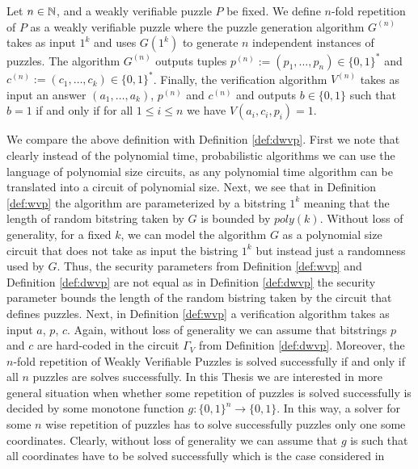\documentclass[11pt,a4paper,titlepage]{memoir}
\begin{document}
%
\begin{definition}
  \label{def:n-fold-rep}
  Let $n \in \mathbb{N}$, and a weakly verifiable puzzle $P$ be fixed.
  We define $n$-fold repetition of $P$ as a weakly verifiable puzzle where the puzzle generation algorithm
  $G^{(n)}$ takes as input $1^k$ and uses $G(1^k)$ to generate $n$ independent instances of puzzles.
  The algorithm $G^{(n)}$ outputs tuples $p^{(n)} := (p_1, \dotsc, p_n) \in \{0,1\}^{*}$ and $c^{(n)} := (c_1, \dotsc, c_k) \in \{0,1\}^{*}$.
  Finally, the verification algorithm $V^{(n)}$ takes as input an answer $(a_1, \dotsc, a_k)$, $p^{(n)}$ and $c^{(n)}$ and outputs $b \in \{0,1\}$
  such that $b = 1$ if and only if for all $1 \leq i \leq n$ we have $V(a_i, c_i, p_i) = 1$.
 \end{definition}
%
We compare the above definition with Definition \ref{def:dwvp}. First we note that clearly instead of the polynomial time, probabilistic algorithms
we can use the language of polynomial size circuits, as any polynomial time algorithm can be translated into a circuit of polynomial size.
Next, we see that in Definition \ref{def:wvp} the algorithm are parameterized by a bitstring $1^k$ meaning that the length of random bitstring
taken by $G$ is bounded by $poly(k)$. Without loss of generality, for a fixed $k$, we can model the algorithm $G$ as a polynomial size circuit
that does not take as input the bistring $1^k$ but instead just a randomness used by $G$. Thus, the security parameters from Definition \ref{def:wvp} and
Definition \ref{def:dwvp} are not equal as in Definition \ref{def:dwvp} the security parameter bounds the length of the random bistring taken by the circuit that defines
puzzles.
Next, in Definition \ref{def:wvp} a verification algorithm takes as input $a$, $p$, $c$. Again, without loss of generality we can assume that
bitstrings $p$ and $c$ are hard-coded in the circuit $\Gamma_V$ from Definition \ref{def:dwvp}.
Moreover, the $n$-fold repetition of Weakly Verifiable Puzzles is solved successfully if and only if all $n$ puzzles are solves successfully.
In this Thesis we are interested in more general situation when whether some repetition of puzzles is solved successfully is decided by some monotone function
$g: \{0,1\}^{n} \rightarrow \{0,1\}$. In this way, a solver for some $n$ wise repetition of puzzles has to solve successfully puzzles only one some coordinates.
Clearly, without loss of generality we can assume that $g$ is such that all coordinates have to be solved successfully which is the case considered in
\end{document}
